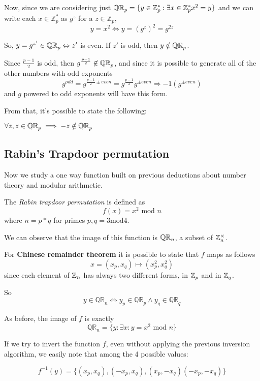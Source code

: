 Now, since we are considering just $\QR[p]=\{y \in \mathbb{Z}_{p}^{*} : \exists x \in \mathbb{Z}_{p}^{*} x^{2}=y\}$ and we can write each $x \in \mathbb{Z}_{p}^{*} $ as $g^{z}$ for a $z \in \mathbb{Z}_{p}$, 
\[
    y=x^{2} \Leftrightarrow y=(g^{z})^{2}=g^{2z}
\]

So, $y = g^{z'} \in \QR[p] \Leftrightarrow z'$ is even. If $z'$ is odd, then $y \notin \QR[p]$.

Since $\frac{p-1}{2}$ is odd, then $g^{\frac{p-1}{2}} \not\in \QR[p]$, and since it is possible to generate all of the other numbers with odd exponents 
\[
    g^{odd}=g^{\frac{p-1}{2} \pm even} = g^{\frac{p-1}{2}}g^{ \pm even} \Rightarrow -1(g^{\pm even})
\]
and $g$ powered to odd exponents will have this form.

From that, it's possible to state the following:
\begin{lemma}
    $\forall z, z\in \QR[p] \implies -z \notin \QR[p]$
\end{lemma}

\subsection{Rabin's Trapdoor permutation}

Now we study a one way function built on previous deductions about number theory and modular arithmetic.

The \textit{Rabin trapdoor permutation} is defined as 
\[
    f(x)=x^{2} \text{ mod } n
\]
where $n=p*q$ for primes $p, q = 3 \text{mod} 4$.

We can observe that the image of this function is $\QR[n]$, a subset of $\integer_n^\times$.

For \textbf{Chinese remainder theorem} it is possible to state that $f$ maps as follows
\[
    x = (x_p, x_q) \mapsto (x^2_p, x^2_q)
\]
since each element of $\integer_n$ has always two different forms, in $\integer_p$ and in $\integer_q$.

So
\[
    y \in  \mathbb{QR}_{n} \Leftrightarrow y_{p} \in \mathbb{QR}_{p} \wedge y_{q} \in \mathbb{QR}_{q} 
\]

As before, the image of $f$ is exactly
\[
    \mathbb{QR}_{n} = \{ y: \exists x : y=x^{2} \text{ mod } n\}
\]

If we try to invert the function $f$, even without applying the previous inversion algorithm, we easily note that among the 4 possible values:

\[
    f^{-1}(y)=\{ (x_{p}, x_{q}),(-x_{p}, x_{q}),(x_{p},- x_{q})(-x_{p},- x_{q})\}
\]\label{les15:outoffour}

